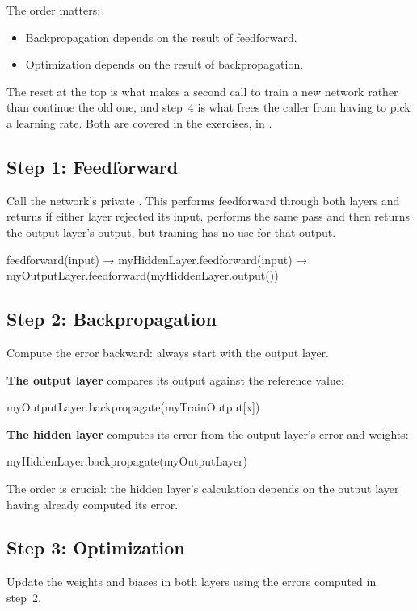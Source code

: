 \noindent The order matters:
\begin{itemize}
  \item Backpropagation depends on the result of feedforward.
  \item Optimization depends on the result of backpropagation.
\end{itemize}
The reset at the top is what makes a second call to  train a new network rather than
continue the old one, and step~4 is what frees the caller from having to pick a learning rate. Both
are covered in the exercises, in .

\subsection{Step 1: Feedforward}
Call the network's private . This performs feedforward through
both layers and returns  if either layer rejected its input.  performs
the same pass and then returns the output layer's output, but training has no use for that output.

\begin{console}
feedforward(input)
  → myHiddenLayer.feedforward(input)
  → myOutputLayer.feedforward(myHiddenLayer.output())
\end{console}

\subsection{Step 2: Backpropagation}
Compute the error backward: always start with the output layer.

\textbf{The output layer} compares its output against the reference value:

\begin{console}
myOutputLayer.backpropagate(myTrainOutput[x])
\end{console}

\noindent\textbf{The hidden layer} computes its error from the output layer's error and weights:

\begin{console}
myHiddenLayer.backpropagate(myOutputLayer)
\end{console}

\noindent The order is crucial: the hidden layer's calculation depends on the output layer having
already computed its error.

\subsection{Step 3: Optimization}
Update the weights and biases in both layers using the errors computed in step~2.

